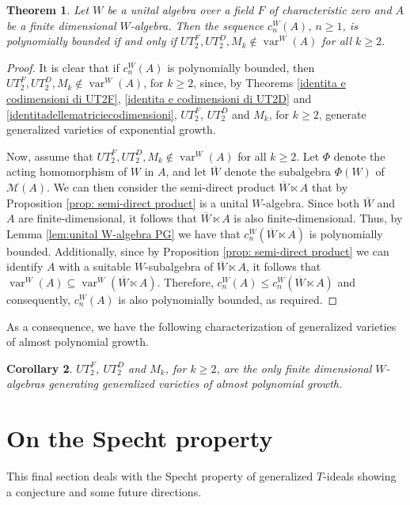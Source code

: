 \documentclass[reqno]{amsart}
\newtheorem{theorem}{Theorem}
\newtheorem{corollary}[theorem]{Corollary}
\theoremstyle{definition}
\numberwithin{equation}{section}
\numberwithin{theorem}{section}
\DeclareMathOperator{\V}{var}
\newcommand{\M}{\mathcal{M}}
\begin{document}
\begin{theorem}
    	Let $W$ be a unital algebra over a field $F$ of characteristic zero and $A$ be a finite dimensional $W$-algebra. Then the sequence $c_n^W(A)$, $n\geq 1$, is polynomially bounded if and only if $UT_2^F, UT_2^D, M_k \notin \V^W(A)$ for all $k\geq 2$.
\end{theorem}
\begin{proof}
    It is clear that if $c_n^W(A)$ is polynomially bounded, then $UT_2^F, UT_2^D, M_k \notin \V^W(A)$, for $k\geq 2$, since, by Theorems \ref{identita e codimensioni di UT2F}, \ref{identita e codimensioni di UT2D} and \ref{identitadellematriciecodimensioni}, $UT_2^F$, $UT_2^D$ and $M_k$, for $k\geq 2$, generate generalized varieties of exponential growth.


    Now, assume that $UT_2^F, UT_2^D , M_k\notin \V^W(A)$ for all $k\geq 2$. Let  $\Phi$ denote the acting homomorphism of $W$ in $A$, and let $\overline{W}$ denote the subalgebra $\Phi(W)$ of $\M(A).$ We can then consider the semi-direct product $\overline{W} \ltimes A$ that by Proposition \ref{prop: semi-direct product} is a unital $W$-algebra. Since both $\overline{W}$ and $A$ are finite-dimensional, it follows that $\overline{W} \ltimes A$ is also finite-dimensional.
    Thus, by Lemma \ref{lem:unital W-algebra PG} we have that $c_n^W(\overline{W}\ltimes A)$ is polynomially bounded. Additionally,  since by Proposition \ref{prop: semi-direct product} we can identify $A$ with a suitable $W$-subalgebra  of $\overline{W}\ltimes A$, it follows that  $\V^W(A) \subseteq \V^W(\overline{W}\ltimes A).$ Therefore, $c^W_n(A)\leq c^W_n(\overline{W}\ltimes A)$ and consequently, $c_n^W(A)$ is also polynomially bounded, as required.
\end{proof}

As a consequence, we have the following characterization of generalized varieties of almost polynomial growth.

\begin{corollary}
$UT_2^F$, $UT_2^D$ and $M_k$, for $k\geq 2$, are the only finite dimensional $W$-algebras generating generalized varieties of almost polynomial growth.
\end{corollary}

\section{On the Specht property}

This final section deals with the Specht property of generalized $T$-ideals showing a conjecture and some future directions.
\end{document}

